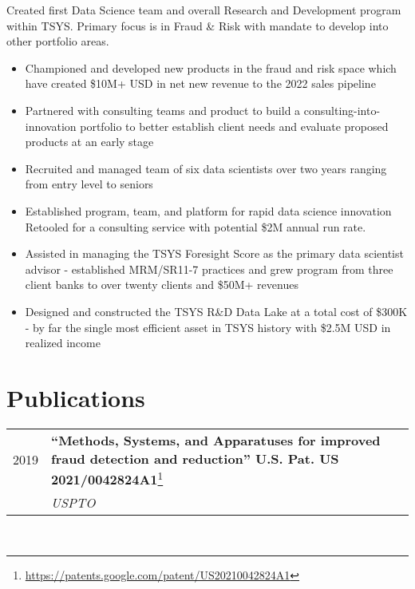 \documentclass[10pt]{article} %
\begin{document}
\begin{minipage}[t]{0.5\textwidth}
\normalsize{Created first Data Science team and overall Research and Development program within TSYS. Primary focus is in Fraud \& Risk with mandate to develop into other portfolio areas. \\
\begin{itemize}
\item Championed and developed new products in the fraud and risk space which have created \$10M+ USD in net new revenue to the 2022 sales pipeline
\item Partnered with consulting teams and product to build a consulting-into-innovation portfolio to better establish client needs and evaluate proposed products at an early stage
\item Recruited and managed team of six data scientists over two years ranging from entry level to seniors 
\item Established program, team, and platform for rapid data science innovation Retooled for a consulting service with potential \$2M annual run rate.  
\item Assisted in managing the TSYS Foresight Score as the primary data scientist advisor - established MRM/SR11-7 practices and grew program from three client banks to over twenty clients and \$50M+ revenues
\item Designed and constructed the TSYS R\&D Data Lake at a total cost of \$300K - by far the single most efficient asset in TSYS history with \$2.5M USD in realized income
\end{itemize}}







\section{Publications} 

\begin{tabular}{rl}
2019 & \parbox{0.75\textwidth}{\textbf{“Methods, Systems, and Apparatuses for improved fraud detection and reduction” U.S. Pat. US 2021/0042824A1}\footnote{\url{https://patents.google.com/patent/US20210042824A1}}}\\
& \textit{USPTO} \\
\end{tabular}\\[10pt]
\end{minipage} %
\end{document}
